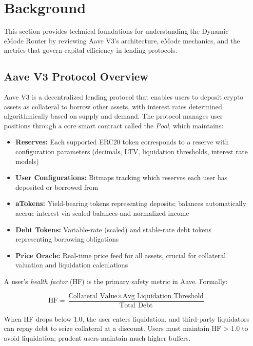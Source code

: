 \section{Background}\label{sec:background}

This section provides technical foundations for understanding the Dynamic eMode Router by reviewing Aave V3's architecture, eMode mechanics, and the metrics that govern capital efficiency in lending protocols.

\subsection{Aave V3 Protocol Overview}\label{sec:aave-overview}

Aave V3 is a decentralized lending protocol that enables users to deposit crypto assets as collateral to borrow other assets, with interest rates determined algorithmically based on supply and demand. The protocol manages user positions through a core smart contract called the \textit{Pool}, which maintains:

\begin{itemize}
    \item \textbf{Reserves:} Each supported ERC20 token corresponds to a reserve with configuration parameters (decimals, LTV, liquidation thresholds, interest rate models)
    \item \textbf{User Configurations:} Bitmaps tracking which reserves each user has deposited or borrowed from
    \item \textbf{aTokens:} Yield-bearing tokens representing deposits; balances automatically accrue interest via scaled balances and normalized income
    \item \textbf{Debt Tokens:} Variable-rate (scaled) and stable-rate debt tokens representing borrowing obligations
    \item \textbf{Price Oracle:} Real-time price feed for all assets, crucial for collateral valuation and liquidation calculations
\end{itemize}

A user's \textit{health factor} (HF) is the primary safety metric in Aave. Formally:

\begin{equation}\label{eq:health-factor}
\text{HF} = \frac{\text{Collateral Value} \times \text{Avg Liquidation Threshold}}{\text{Total Debt}}
\end{equation}

When HF drops below 1.0, the user enters liquidation, and third-party liquidators can repay debt to seize collateral at a discount. Users must maintain HF > 1.0 to avoid liquidation; prudent users maintain much higher buffers.

